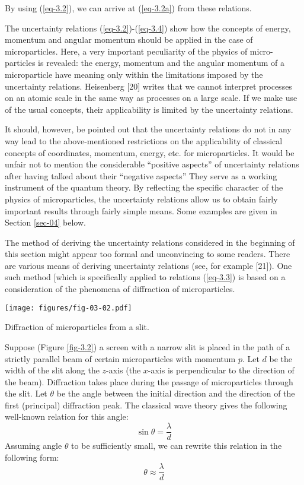 \documentclass[a4paper,sfsidenotes,colorlinks=true]{tufte-book}
\numberwithin{equation}{section}
\numberwithin{figure}{section}
\begin{document}
By using (\ref{eq-3.2}), we can arrive at (\ref{eq-3.2a}) from these relations.

The uncertainty relations (\ref{eq-3.2})-(\ref{eq-3.4}) show how the
concepts of energy, momentum and angular momentum should be applied in
the case of microparticles. Here, a very important peculiarity of the
physics of micro- particles is revealed: the energy, momentum and the
angular momentum of a microparticle have meaning only within the
limitations imposed by the uncertainty relations. Heisenberg [20]
writes that we cannot interpret processes on an atomic scale in the
same way as processes on a large scale. If we make use of the usual
concepts, their applicability is limited by the uncertainty relations.

It should, however, be pointed out that the uncertainty relations do
not in any way lead to the above-mentioned restrictions on the
applicability of classical concepts of coordinates, momentum, energy,
etc. for microparticles. It would be unfair not to mention the
considerable ``positive aspects'' of uncertainty relations after
having talked about their ``negative aspects'' They serve as a working
instrument of the quantum theory. By reflecting the specific
character of the physics of microparticles, the uncertainty
relations allow us to obtain fairly important results through fairly
simple means. Some examples are given in Section \ref{sec-04} below.

The method of deriving the uncertainty relations
considered in the beginning of this section might appear too formal
and unconvincing to some readers. There are various means of deriving
uncertainty relations (see, for example [21]). One such method [which
is specifically applied to relations (\ref{eq-3.3}) is based on a
consideration of the phenomena of diffraction of microparticles.
\begin{marginfigure}%
\centering
\texttt{[image: figures/fig-03-02.pdf]}
\caption{Diffraction of microparticles from a slit.}
\label{fig-3.2}
\end{marginfigure}

Suppose (Figure \ref{fig-3.2}) a screen with a narrow slit is placed
in the path of a strictly parallel beam of certain microparticles with
momentum $p$. Let $d$ be the width of the slit along the $z$-axis (the
$x$-axis is perpendicular to the direction of the beam). Diffraction
takes place during the passage of microparticles through the slit. Let
$\theta$ be the angle between the initial direction and the direction of the
first (principal) diffraction peak. The classical wave theory gives
the following well-known relation for this angle:
\begin{equation*}%
\sin \theta = \frac{\lambda}{d}
\end{equation*}
Assuming angle $\theta$ to be sufficiently small, we can rewrite this
relation in the following form:
\begin{equation}%
 \theta \approx \frac{\lambda}{d}
\label{eq-3.5}
\end{equation}
\end{document}

